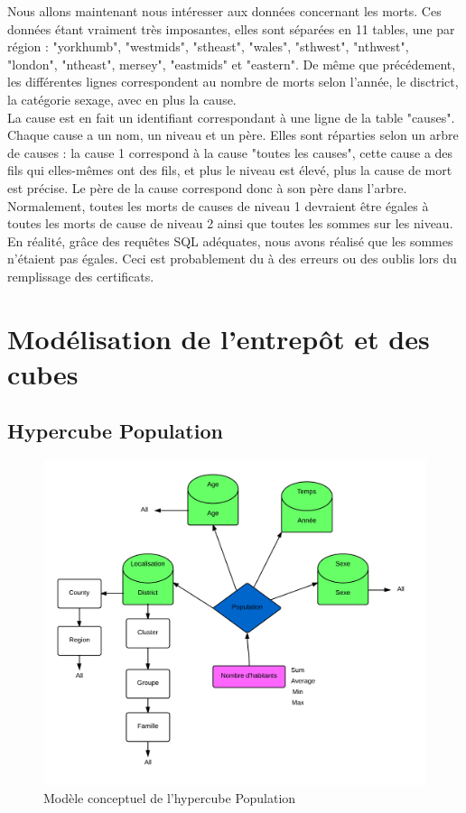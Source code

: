 \begin{paragraph}
Nous allons maintenant nous intéresser aux données concernant les morts. Ces données étant vraiment très imposantes, elles sont séparées en 11 tables, une par région : "yorkhumb", "westmids", "stheast", "wales", "sthwest", "nthwest", "london", "ntheast", mersey", "eastmids" et "eastern". De même que précédement, les différentes lignes correspondent au nombre de morts selon l'année, le disctrict, la catégorie sexage, avec en plus la cause. \\
La cause est en fait un identifiant correspondant à une ligne de la table "causes". Chaque cause a un nom, un niveau et un père. Elles sont réparties selon un arbre de causes : la cause 1 correspond à la cause "toutes les causes", cette cause a des fils qui elles-mêmes ont des fils, et plus le niveau est élevé, plus la cause de mort est précise. Le père de la cause correspond donc à son père dans l'arbre. Normalement, toutes les morts de causes de niveau 1 devraient être égales à toutes les morts de cause de niveau 2 ainsi que toutes les sommes sur les niveau. En réalité, grâce des requêtes SQL adéquates, nous avons réalisé que les sommes n'étaient pas égales. Ceci est probablement du à des erreurs ou des oublis lors du remplissage des certificats. \\
\end{paragraph}

\pagebreak


\chapter{Modélisation de l'entrepôt et des cubes}

\section{Hypercube Population}
\begin{figure}[h!]
    \centering
    \includegraphics[width=\linewidth]{images/pop/cube.png}
    \caption{Modèle conceptuel de l'hypercube Population}
    \label{conception_cube_pop}
\end{figure}

